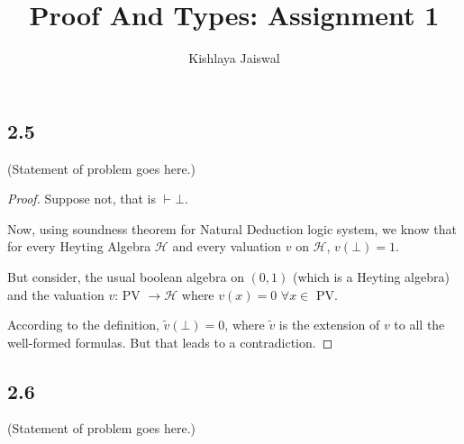 \documentclass[12pt]{article}
\title{Proof And Types: Assignment 1}
\author{Kishlaya Jaiswal}
\begin{document}
\maketitle

\vspace{0.5in}



\subsection*{2.5}
(Statement of problem goes here.)\\

\begin{proof}
Suppose not, that is $\vdash \bot$.

Now, using soundness theorem for Natural Deduction logic system, we know that for every Heyting Algebra $\mathcal{H}$ and every valuation $v$ on $\mathcal{H}$, $v(\bot) = 1$.

But consider, the usual boolean algebra on $(0,1)$ (which is a Heyting algebra) and the valuation $v$: PV $\rightarrow \mathcal{H}$ where $v(x) = 0$ $\forall x \in$ PV.

According to the definition, $\widetilde{v}(\bot) = 0$, where $\widetilde{v}$ is the extension of $v$ to all the well-formed formulas. But that leads to a contradiction.
\end{proof}


\subsection*{2.6}
(Statement of problem goes here.)\\
\end{document}
